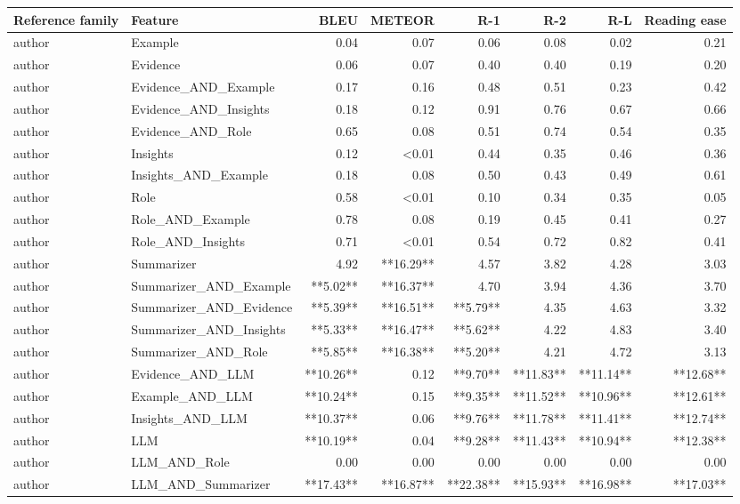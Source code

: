 \begin{tabular}{llrrrrrr}
\toprule
Reference family & Feature & BLEU & METEOR & R-1 & R-2 & R-L & Reading ease \\
\midrule
author & Example & 0.04 & 0.07 & 0.06 & 0.08 & 0.02 & 0.21 \\
author & Evidence & 0.06 & 0.07 & 0.40 & 0.40 & 0.19 & 0.20 \\
author & Evidence_AND_Example & 0.17 & 0.16 & 0.48 & 0.51 & 0.23 & 0.42 \\
author & Evidence_AND_Insights & 0.18 & 0.12 & 0.91 & 0.76 & 0.67 & 0.66 \\
author & Evidence_AND_Role & 0.65 & 0.08 & 0.51 & 0.74 & 0.54 & 0.35 \\
author & Insights & 0.12 & <0.01 & 0.44 & 0.35 & 0.46 & 0.36 \\
author & Insights_AND_Example & 0.18 & 0.08 & 0.50 & 0.43 & 0.49 & 0.61 \\
author & Role & 0.58 & <0.01 & 0.10 & 0.34 & 0.35 & 0.05 \\
author & Role_AND_Example & 0.78 & 0.08 & 0.19 & 0.45 & 0.41 & 0.27 \\
author & Role_AND_Insights & 0.71 & <0.01 & 0.54 & 0.72 & 0.82 & 0.41 \\
author & Summarizer & 4.92 & **16.29** & 4.57 & 3.82 & 4.28 & 3.03 \\
author & Summarizer_AND_Example & **5.02** & **16.37** & 4.70 & 3.94 & 4.36 & 3.70 \\
author & Summarizer_AND_Evidence & **5.39** & **16.51** & **5.79** & 4.35 & 4.63 & 3.32 \\
author & Summarizer_AND_Insights & **5.33** & **16.47** & **5.62** & 4.22 & 4.83 & 3.40 \\
author & Summarizer_AND_Role & **5.85** & **16.38** & **5.20** & 4.21 & 4.72 & 3.13 \\
author & Evidence_AND_LLM & **10.26** & 0.12 & **9.70** & **11.83** & **11.14** & **12.68** \\
author & Example_AND_LLM & **10.24** & 0.15 & **9.35** & **11.52** & **10.96** & **12.61** \\
author & Insights_AND_LLM & **10.37** & 0.06 & **9.76** & **11.78** & **11.41** & **12.74** \\
author & LLM & **10.19** & 0.04 & **9.28** & **11.43** & **10.94** & **12.38** \\
author & LLM_AND_Role & 0.00 & 0.00 & 0.00 & 0.00 & 0.00 & 0.00 \\
author & LLM_AND_Summarizer & **17.43** & **16.87** & **22.38** & **15.93** & **16.98** & **17.03** \\

\end{tabular}
